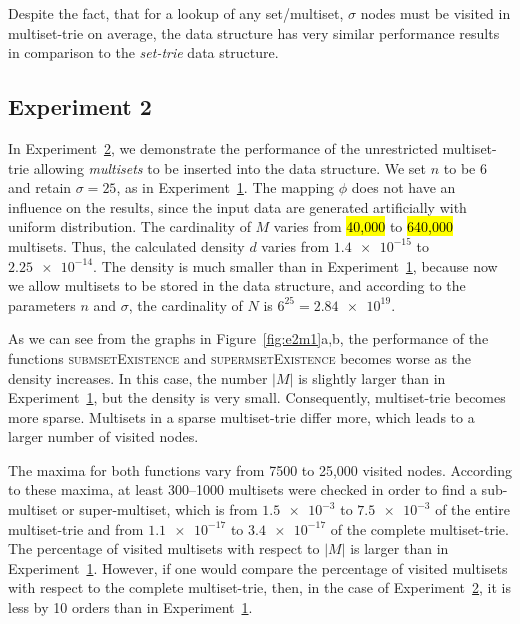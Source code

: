 \documentclass[algorithms,article,accept,pdftex,moreauthors]{Definitions/mdpi}
\begin{document}
Despite the fact, that for a lookup of any set/multiset, $\sigma$ nodes must be visited 
in multiset-trie on average, the data structure has very similar performance 
results in comparison to the \emph{set-trie} data structure.

\subsection{Experiment 2} \label{s:exp2}
In Experiment~\hyperref[s:exp2]{2}, we demonstrate the performance of 
the unrestricted multiset-trie allowing \emph{multisets} to be inserted into the data structure. 
We set $n$ to be 6 and retain $\sigma = 25$, as in Experiment~\hyperref[s:exp1]{1}. 
The mapping $\phi$ does not have an influence on the results, since the input 
data are generated artificially with uniform distribution. The cardinality of $M$ 
varies from \hl{40,000} to \hl{640,000} multisets. Thus, the calculated density $d$ varies 
from $\num{1.4e-15}$ to $\num{2.25e-14}.$ The density is much smaller than 
in Experiment~\hyperref[s:exp1]{1}, because now we allow multisets to be stored 
in the data structure, and according to the parameters $n$ and $\sigma$, the 
cardinality of $N$ is $6^{25} = \num{2.84e19}.$

As we can see from the graphs in Figure~\ref{fig:e2m1}a,b, 
the performance of the functions \textsc{submsetExistence} and 
\textsc{supermsetExistence} becomes worse as the density increases. 
In this case, the number $|M|$ is slightly larger than in 
Experiment~\hyperref[s:exp1]{1}, but the density is very small. Consequently, 
multiset-trie becomes more sparse. Multisets in a sparse multiset-trie differ more, 
which leads to a larger number of visited nodes. 

The maxima for both functions vary from 7500 to 25,000 visited nodes. According 
to these maxima, at least 300--1000 multisets were checked in order to find a 
sub-multiset or super-multiset, which is from $\num{1.5e-3}$ to $\num{7.5e-3}$ of the entire 
multiset-trie and from $\num{1.1e-17}$ to $\num{3.4e-17}$ of the complete 
multiset-trie. The percentage of visited multisets with respect to $|M|$ is 
larger than in Experiment~\hyperref[s:exp1]{1}. However, if one would compare 
the percentage of visited multisets with respect to the complete multiset-trie, then, 
in the case of Experiment~\hyperref[s:exp2]{2}, it is less by 10 orders than in 
Experiment~\hyperref[s:exp1]{1}.
\end{document}
